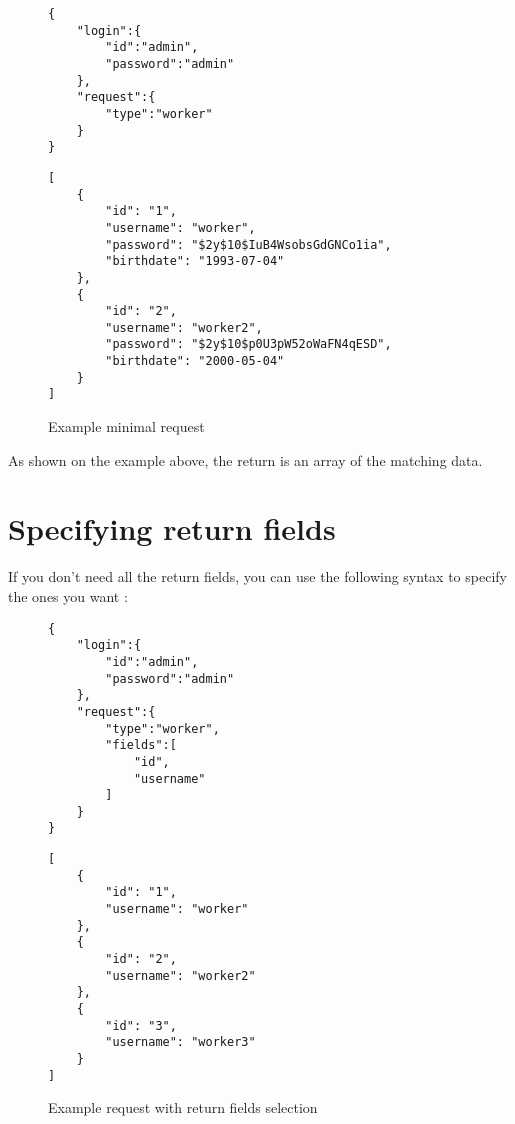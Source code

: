 \documentclass[notitlepage]{report}
\begin{document}
\begin{figure}[h]
\centering
\begin{minipage}{.45\linewidth}
\begin{verbatim}
{
	"login":{	
		"id":"admin",
		"password":"admin"
	},
	"request":{
		"type":"worker"
	}
}
\end{verbatim}
\end{minipage}
\begin{minipage}{.45\linewidth}
\begin{verbatim}
[
    {
        "id": "1",
        "username": "worker",
        "password": "$2y$10$IuB4WsobsGdGNCo1ia",
        "birthdate": "1993-07-04"
    },
    {
        "id": "2",
        "username": "worker2",
        "password": "$2y$10$p0U3pW52oWaFN4qESD",
        "birthdate": "2000-05-04"
    }
]
\end{verbatim}
\end{minipage}
\caption{Example minimal request}
\end{figure}
As shown on the example above, the return is an array of the matching data.

\newpage
\section{Specifying return fields}
If you don't need all the return fields, you can use the following syntax to specify the ones you want :
\begin{figure}[h]
\centering
\begin{minipage}{.45\linewidth}
\begin{verbatim}
{
	"login":{	
		"id":"admin",
		"password":"admin"
	},
	"request":{
		"type":"worker",
		"fields":[
			"id",
			"username"
		]
	}
}

\end{verbatim}
\end{minipage}
\begin{minipage}{.45\linewidth}
\begin{verbatim}
[
    {
        "id": "1",
        "username": "worker"
    },
    {
        "id": "2",
        "username": "worker2"
    },
    {
        "id": "3",
        "username": "worker3"
    }
]
\end{verbatim}
\end{minipage}
\caption{Example request with return fields selection}
\end{figure}
\end{document}
